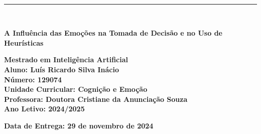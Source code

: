 \documentclass[a4paper,12pt]{report}
\begin{document}
	
	\begin{titlepage}
		\centering
		\vspace*{-2cm} %
		\hfill%
		\\[0.5cm]
		\noindent
		{\color{barraazul}\rule{\textwidth}{1mm}} %
		\\[1cm]
		{\LARGE \textbf{A Influência das Emoções na Tomada de Decisão e no Uso de Heurísticas} \par}
		\vspace{0.5cm}
		\textbf{Mestrado em Inteligência Artificial} \\
		\vspace{1cm}
		\textbf{Aluno: Luís Ricardo Silva Inácio} \\
		\textbf{Número: 129074} \\
		\vspace{1cm}
		\textbf{Unidade Curricular: Cognição e Emoção} \\
		\vspace{1cm}
		\textbf{Professora: Doutora Cristiane da Anunciação Souza} \\
		\vfill
		\textbf{Ano Letivo: 2024/2025} \par
		\vfill
		\textbf{Data de Entrega: 29 de novembro de 2024} \par
	\end{titlepage}
	
	\newpage
	\thispagestyle{empty}
	\mbox{}
	\newpage
	
	
\end{document}

